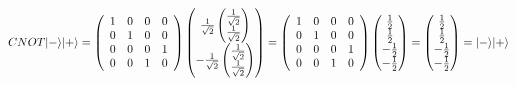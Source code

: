 \documentclass{article}
\DeclarePairedDelimiter\ket{\lvert}{\rangle}
\begin{document}
\[CNOT \ket{-}\ket{+}  =  \left(
    \begin{array}{cccc} 
        1 & 0 & 0 & 0\\
        0 & 1 & 0 & 0\\
        0 & 0 & 0 & 1\\
        0 & 0 & 1 & 0
    \end{array} 
\right)\begin{pmatrix} \frac{1}{\sqrt{2}} \begin{pmatrix} \frac{1}{\sqrt{2}} \\ \frac{1}{\sqrt{2}} \end{pmatrix} \\ - \frac{1}{\sqrt{2}} \begin{pmatrix} \frac{1}{\sqrt{2}} \\ \frac{1}{\sqrt{2}} \end{pmatrix} \end{pmatrix} = \left(
    \begin{array}{cccc} 
        1 & 0 & 0 & 0\\
        0 & 1 & 0 & 0\\
        0 & 0 & 0 & 1\\
        0 & 0 & 1 & 0
    \end{array} 
\right)\begin{pmatrix} \frac{1}{2} \\ \frac{1}{2} \\ -\frac{1}{2} \\ -\frac{1}{2}  \end{pmatrix} = \begin{pmatrix} \frac{1}{2} \\ \frac{1}{2} \\ -\frac{1}{2} \\ -\frac{1}{2}  \end{pmatrix} = \ket{-}\ket{+}\]
\end{document}
